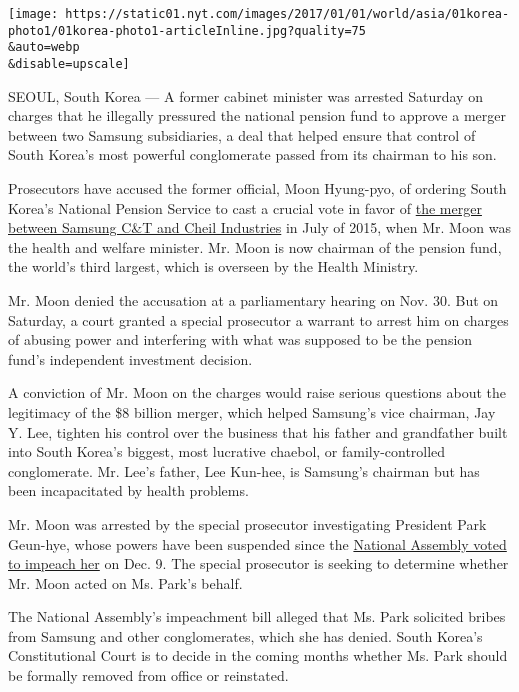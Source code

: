 \texttt{[image: https://static01.nyt.com/images/2017/01/01/world/asia/01korea-photo1/01korea-photo1-articleInline.jpg?quality=75\\\&auto=webp\\\&disable=upscale]}

SEOUL, South Korea --- A former cabinet minister was arrested Saturday
on charges that he illegally pressured the national pension fund to
approve a merger between two Samsung subsidiaries, a deal that helped
ensure that control of South Korea's most powerful conglomerate passed
from its chairman to his son.

Prosecutors have accused the former official, Moon Hyung-pyo, of
ordering South Korea's National Pension Service to cast a crucial vote
in favor of
\href{http://www.nytimes.com/2015/07/18/business/dealbook/samsung-ct-shareholders-back-cheil-industries-merger-defying-activist-hedge-fund-elliott-associates.html}{the
merger between Samsung C\&T and Cheil Industries} in July of 2015, when
Mr. Moon was the health and welfare minister. Mr. Moon is now chairman
of the pension fund, the world's third largest, which is overseen by the
Health Ministry.

Mr. Moon denied the accusation at a parliamentary hearing on Nov. 30.
But on Saturday, a court granted a special prosecutor a warrant to
arrest him on charges of abusing power and interfering with what was
supposed to be the pension fund's independent investment decision.

A conviction of Mr. Moon on the charges would raise serious questions
about the legitimacy of the \$8 billion merger, which helped Samsung's
vice chairman, Jay Y. Lee, tighten his control over the business that
his father and grandfather built into South Korea's biggest, most
lucrative chaebol, or family-controlled conglomerate. Mr. Lee's father,
Lee Kun-hee, is Samsung's chairman but has been incapacitated by health
problems.

Mr. Moon was arrested by the special prosecutor investigating President
Park Geun-hye, whose powers have been suspended since the
\href{https://www.nytimes.com/2016/12/09/world/asia/south-korea-president-park-geun-hye-impeached.html}{National
Assembly voted to impeach her} on Dec. 9. The special prosecutor is
seeking to determine whether Mr. Moon acted on Ms. Park's behalf.

The National Assembly's impeachment bill alleged that Ms. Park solicited
bribes from Samsung and other conglomerates, which she has denied. South
Korea's Constitutional Court is to decide in the coming months whether
Ms. Park should be formally removed from office or reinstated.

